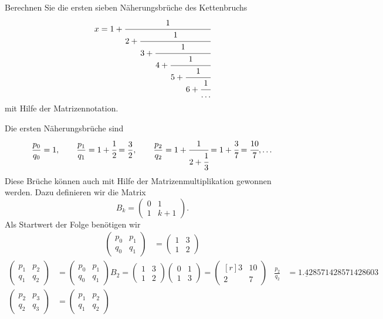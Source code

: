 Berechnen Sie die ersten sieben Näherungsbrüche des Kettenbruchs
\[
x
=
1+\cfrac{1}{2+\cfrac{1}{3+\cfrac{1}{4+\cfrac{1}{5+\cfrac{1}{6+\cfrac{1}{\dots}}}}}}
\]
mit Hilfe der Matrizennotation.


\begin{loesung}
Die ersten Näherungsbrüche sind
\[
\frac{p_0}{q_0} = 1,\qquad
\frac{p_1}{q_1} = 1+\cfrac{1}{2} = \frac{3}{2},\qquad
\frac{p_2}{q_2} = 1 + \cfrac{1}{2+\cfrac{1}{3}} = 1+\cfrac{3}{7}=\cfrac{10}{7},\dots
\]
Diese Brüche können auch mit Hilfe der Matrizenmultiplikation gewonnen werden.
Dazu definieren wir die Matrix 
\[
B_k
=
\begin{pmatrix}
0&1\\
1&k+1
\end{pmatrix}
.
\]
Als Startwert der Folge benötigen wir
\begin{align*}
\begin{pmatrix}
p_0&p_1\\
q_0&q_1
\end{pmatrix}
&=
\begin{pmatrix}
1&3\\
1&2
\end{pmatrix}
\end{align*}
\begin{align*}
\begin{pmatrix}
p_1&p_2\\
q_1&q_2
\end{pmatrix}
&=
\begin{pmatrix}
p_0&p_1\\
q_0&q_1
\end{pmatrix}
B_2
=
\begin{pmatrix}
1&3\\
1&2
\end{pmatrix}
\begin{pmatrix}
0&1\\
1&3
\end{pmatrix}
=
\begin{pmatrix*}[r]
3&10\\
2& 7
\end{pmatrix*}
&
\frac{p_2}{q_2}
&=
1.\underline{4}28571428571428603
\\
\begin{pmatrix}
p_2&p_3\\
q_2&q_3
\end{pmatrix}
&=
\begin{pmatrix}
p_1&p_2\\
q_1&q_2
\end{pmatrix}

\end{align*}
\end{loesung}

